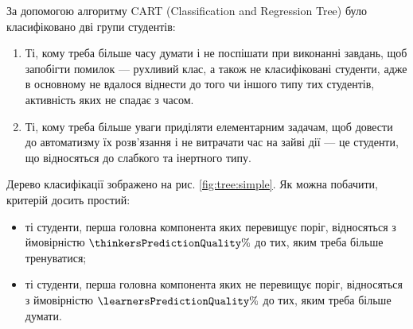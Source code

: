 За допомогою алгоритму CART (Classification and Regression Tree) було
класифіковано дві групи студентів:
\begin{enumerate}
  \item
    Ті, кому треба більше часу думати і не поспішати при виконанні завдань,
    щоб запобігти помилок --- рухливий клас, а також не класифіковані
    студенти, адже в основному не вдалося віднести до того чи іншого типу
    тих студентів, активність яких не спадає з часом.
  \item
    Ті, кому треба більше уваги приділяти елементарним задачам,
    щоб довести до автоматизму їх розв’язання і не витрачати час на
    зайві дії --- це студенти, що відносяться до слабкого та інертного типу.
\end{enumerate}
Дерево класифікації зображено на рис. \ref{fig:tree:simple}.
Як можна побачити, критерій досить простий:
\begin{itemize}
  \item
    ті студенти, перша головна компонента яких перевищує поріг,
    відносяться з ймовірністю $\thinkersPredictionQuality\%$ до тих,
    яким треба більше тренуватися;
  \item
    ті студенти, перша головна компонента яких не перевищує поріг,
    відносяться з ймовірністю $\learnersPredictionQuality\%$ до тих,
    яким треба більше думати.
\end{itemize}
